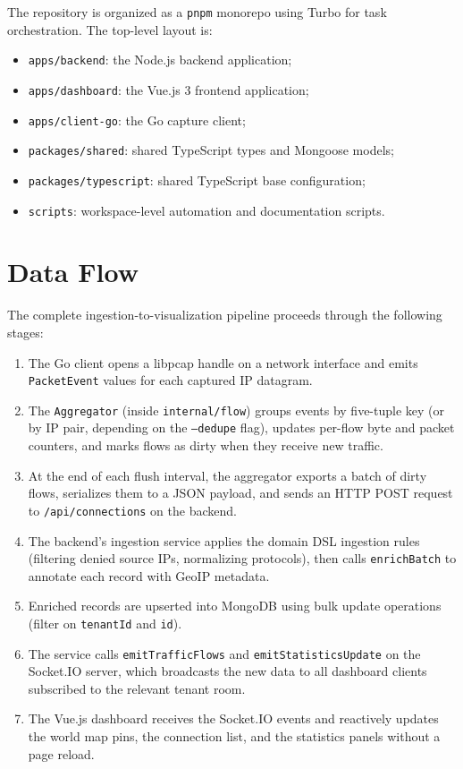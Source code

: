\documentclass[12pt]{report}
\begin{document}
The repository is organized as a \texttt{pnpm} monorepo using Turbo for task
orchestration. The top-level layout is:

\begin{itemize}
  \item \texttt{apps/backend}: the Node.js backend application;
  \item \texttt{apps/dashboard}: the Vue.js 3 frontend application;
  \item \texttt{apps/client-go}: the Go capture client;
  \item \texttt{packages/shared}: shared TypeScript types and Mongoose models;
  \item \texttt{packages/typescript}: shared TypeScript base configuration;
  \item \texttt{scripts}: workspace-level automation and documentation scripts.
\end{itemize}

\section{Data Flow}

The complete ingestion-to-visualization pipeline proceeds through the following
stages:

\begin{enumerate}
  \item The Go client opens a libpcap handle on a network interface and emits
    \texttt{PacketEvent} values for each captured IP datagram.
  \item The \texttt{Aggregator} (inside \texttt{internal/flow}) groups events
    by five-tuple key (or by IP pair, depending on the \texttt{--dedupe} flag),
    updates per-flow byte and packet counters, and marks flows as dirty when
    they receive new traffic.
  \item At the end of each flush interval, the aggregator exports a batch of
    dirty flows, serializes them to a JSON payload, and sends an HTTP POST
    request to \texttt{/api/connections} on the backend.
  \item The backend's ingestion service applies the domain DSL ingestion rules
    (filtering denied source IPs, normalizing protocols), then calls
    \texttt{enrichBatch} to annotate each record with GeoIP metadata.
  \item Enriched records are upserted into MongoDB using bulk update operations
    (filter on \texttt{tenantId} and \texttt{id}).
  \item The service calls \texttt{emitTrafficFlows} and
    \texttt{emitStatisticsUpdate} on the Socket.IO server, which broadcasts the
    new data to all dashboard clients subscribed to the relevant tenant room.
  \item The Vue.js dashboard receives the Socket.IO events and reactively
    updates the world map pins, the connection list, and the statistics panels
    without a page reload.
\end{enumerate}
\end{document}
